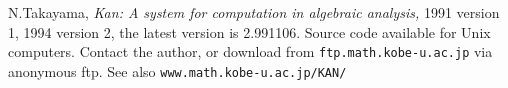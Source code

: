 
\begin{thebibliography}{ }

\bibitem[kan]
	N.Takayama,
	{\em Kan: A system for computation in
	algebraic analysis,} 1991 version 1,
        1994 version 2, the latest version is 2.991106.
	Source code available for Unix computers. 
         Contact the author, or download from 
	{\tt \small ftp.math.kobe-u.ac.jp} via anonymous ftp.
        See also {\tt \small www.math.kobe-u.ac.jp/KAN/}

\end{thebibliography}
